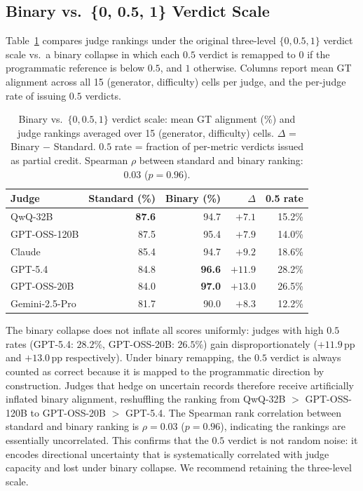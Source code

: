 \subsection*{Binary vs.\ \{0, 0.5, 1\} Verdict Scale}
\label{app:abl-binary}

Table~\ref{tab:abl-binary} compares judge rankings under the original three-level $\{0, 0.5, 1\}$ verdict scale vs.\ a binary collapse in which each $0.5$ verdict is remapped to $0$ if the programmatic reference is below $0.5$, and $1$ otherwise. Columns report mean GT alignment across all 15 (generator, difficulty) cells per judge, and the per-judge rate of issuing $0.5$ verdicts.

\begin{table}[!htbp]
\centering
\small
\setlength{\tabcolsep}{5pt}
\renewcommand{\arraystretch}{1.1}
\caption{Binary vs.\ $\{0, 0.5, 1\}$ verdict scale: mean GT alignment (\%) and judge rankings averaged over 15 (generator, difficulty) cells. $\Delta$ = Binary $-$ Standard. $0.5$ rate = fraction of per-metric verdicts issued as partial credit. Spearman $\rho$ between standard and binary ranking: $0.03$ ($p = 0.96$).}
\label{tab:abl-binary}
\begin{tabular}{@{}lrrrr@{}}
\toprule
\textbf{Judge} & \textbf{Standard (\%)} & \textbf{Binary (\%)} & \textbf{$\Delta$} & \textbf{0.5 rate} \\
\midrule
QwQ-32B        & \textbf{87.6} & 94.7 & $+7.1$ & 15.2\% \\
GPT-OSS-120B   & 87.5          & 95.4 & $+7.9$ & 14.0\% \\
Claude         & 85.4          & 94.7 & $+9.2$ & 18.6\% \\
GPT-5.4        & 84.8          & \textbf{96.6} & $+11.9$ & 28.2\% \\
GPT-OSS-20B    & 84.0          & \textbf{97.0} & $+13.0$ & 26.5\% \\
Gemini-2.5-Pro & 81.7          & 90.0 & $+8.3$ & 12.2\% \\
\bottomrule
\end{tabular}
\end{table}

The binary collapse does not inflate all scores uniformly: judges with high $0.5$ rates (GPT-5.4: $28.2\%$, GPT-OSS-20B: $26.5\%$) gain disproportionately ($+11.9$\,pp and $+13.0$\,pp respectively). Under binary remapping, the $0.5$ verdict is always counted as correct because it is mapped to the programmatic direction by construction. Judges that hedge on uncertain records therefore receive artificially inflated binary alignment, reshuffling the ranking from QwQ-32B $>$ GPT-OSS-120B to GPT-OSS-20B $>$ GPT-5.4. The Spearman rank correlation between standard and binary ranking is $\rho = 0.03$ ($p = 0.96$), indicating the rankings are essentially uncorrelated. This confirms that the $0.5$ verdict is not random noise: it encodes directional uncertainty that is systematically correlated with judge capacity and lost under binary collapse. We recommend retaining the three-level scale.

